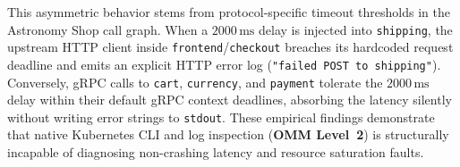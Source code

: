 This asymmetric behavior stems from protocol-specific timeout thresholds in the Astronomy Shop call graph. When a $2000\,\text{ms}$ delay is injected into \texttt{shipping}, the upstream HTTP client inside \texttt{frontend}/\texttt{checkout} breaches its hardcoded request deadline and emits an explicit HTTP error log (\texttt{"failed POST to shipping"}). Conversely, gRPC calls to \texttt{cart}, \texttt{currency}, and \texttt{payment} tolerate the $2000\,\text{ms}$ delay within their default gRPC context deadlines, absorbing the latency silently without writing error strings to \texttt{stdout}. These empirical findings demonstrate that native Kubernetes CLI and log inspection (\textbf{OMM Level~2}) is structurally incapable of diagnosing non-crashing latency and resource saturation faults.

